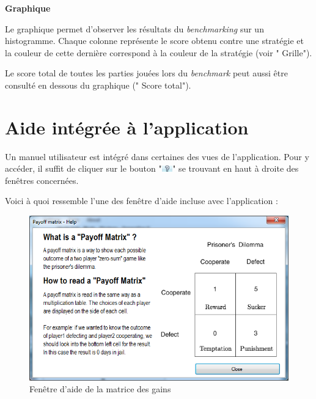 \documentclass[a4paper, french]{article}
\newcommand*\circled[1]{\tikz[baseline=(char.base)]{
                \node[shape=circle,thick,draw,inner sep=2pt] (char) {\textbf{#1}};}
            }
\newcommand*\tinycircled[1]{\tikz[baseline=(char.base)]{
                \node[shape=circle,draw,inner sep=1pt] (char) {\footnotesize{#1}};}
            }
\begin{document}
\textbf{\circled{4} Graphique}

Le graphique permet d'observer les résultats du \textit{benchmarking} sur un histogramme. Chaque colonne représente le score obtenu contre une stratégie et la couleur de cette dernière correspond à la couleur de la stratégie (voir "\tinycircled{1} Grille"). 

Le score total de toutes les parties jouées lors du \textit{benchmark} peut aussi être consulté en dessous du graphique ("\tinycircled{5} Score total").

\pagebreak
\section{Aide intégrée à l'application}
Un manuel utilisateur est intégré dans certaines des vues de l'application. Pour y accéder, il suffit de cliquer sur le bouton "\includegraphics[height=0.75em]{questionmark.png}" se trouvant en haut à droite des fenêtres concernées.

Voici à quoi ressemble l'une des fenêtre d'aide incluse avec l'application :

\vspace{0.5cm}
\begin{figure}[htp]
    \centering
    \includegraphics[width=\linewidth - 2cm]{payoff_help.png}
    \caption{Fenêtre d'aide de la matrice des gains}
\end{figure}


\pagebreak
\listoffigures
\listoftables
\end{document}
